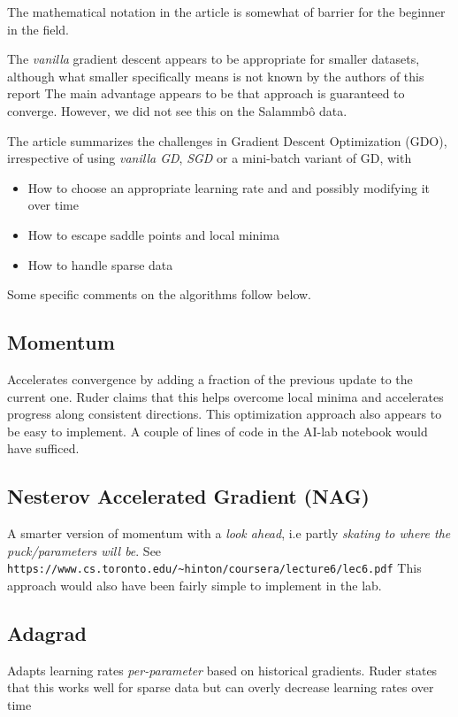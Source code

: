 \documentclass[a4paper]{article}
\begin{document}
The mathematical notation in the article is somewhat of barrier for the beginner in the field. 

The \emph{vanilla} gradient descent appears to be appropriate for smaller datasets, although what smaller specifically means is not known by the authors of this report
The main advantage appears to be that approach is guaranteed to converge.
However, we did not see this on the Salammbô data.   

The article summarizes the challenges in Gradient Descent Optimization (GDO), irrespective of using \emph{vanilla GD}, \emph{SGD} or a mini-batch variant of GD, with
\begin{itemize}
    \item How to choose an appropriate learning rate and and possibly modifying it over time
    \item  How to escape saddle points and local minima
    \item  How to handle sparse data
\end{itemize}

Some specific comments on the algorithms follow below.

\subsection{Momentum}
Accelerates convergence by adding a fraction of the previous update to the current one.
Ruder claims that this helps overcome local minima and accelerates progress along consistent directions. This optimization approach also appears to be easy to implement.
A couple of lines of code in the AI-lab notebook would have sufficed.

\subsection{Nesterov Accelerated Gradient (NAG)}
A smarter version of momentum with a \emph{look ahead}, i.e partly \emph{skating to where the puck/parameters will be}. See \verb|https://www.cs.toronto.edu/~hinton/coursera/lecture6/lec6.pdf| 
This approach would also have been fairly simple to implement in the lab.

\subsection{Adagrad}
Adapts learning rates \emph{per-parameter} based on historical gradients.
Ruder states that this works well for sparse data but can overly decrease learning rates over time
\end{document}
